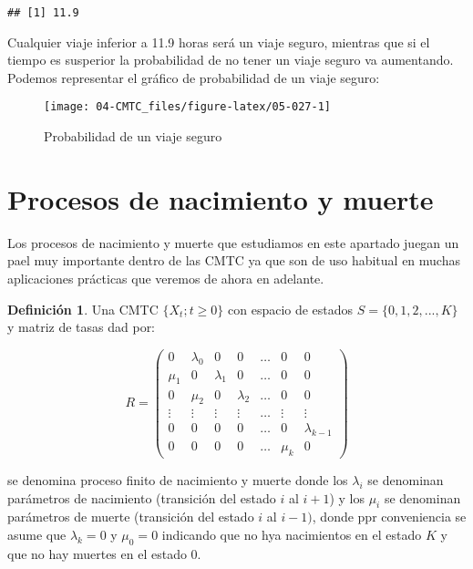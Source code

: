 \documentclass[
]{book}
\newenvironment{yellowbox}{
  \definecolor{shadecolor}{rgb}{210, 180, 140}  
  \color{black}
  \begin{shaded}}
 {\end{shaded}}
\theoremstyle{definition}
\newtheorem{definition}{Definición}[chapter]
\theoremstyle{definition}
\theoremstyle{definition}
\theoremstyle{definition}
\theoremstyle{remark}
\begin{document}
\begin{verbatim}
## [1] 11.9
\end{verbatim}

Cualquier viaje inferior a 11.9 horas será un viaje seguro, mientras que si el tiempo es susperior la probabilidad de no tener un viaje seguro va aumentando. Podemos representar el gráfico de probabilidad de un viaje seguro:

\begin{figure}

{\centering \texttt{[image: 04-CMTC\_files/figure-latex/05-027-1]} 

}

\caption{Probabilidad de un viaje seguro}\label{fig:05-027}
\end{figure}

\hypertarget{CMTCD}{%
\section{Procesos de nacimiento y muerte}\label{CMTCD}}

Los procesos de nacimiento y muerte que estudiamos en este apartado juegan un pael muy importante dentro de las CMTC ya que son de uso habitual en muchas aplicaciones prácticas que veremos de ahora en adelante.

\begin{yellowbox}

\begin{definition}
\protect\hypertarget{def:cmtc002}{}\label{def:cmtc002}Una CMTC \(\{X_t; t \geq 0\}\) con espacio de estados \(S = \{0, 1, 2,...,K\}\) y matriz de tasas dad por:

\[R = 
\begin{pmatrix}
0 & \lambda_0 & 0 & 0 & \ldots & 0 & 0 \\
\mu_1 & 0 & \lambda_1 & 0 & \ldots & 0 & 0 \\
0 & \mu_2 & 0 & \lambda_2 & \ldots & 0 & 0 \\
\vdots & \vdots & \vdots & \vdots & \ldots & \vdots & \vdots \\
0 & 0 & 0 & 0 & \ldots & 0 & \lambda_{k-1} \\
0 & 0 & 0 & 0 & \ldots &\mu_k & 0
\end{pmatrix} \]

se denomina proceso finito de nacimiento y muerte donde los \(\lambda_i\) se denominan parámetros de nacimiento (transición del estado \(i\) al \(i+1\)) y los \(\mu_i\) se denominan parámetros de muerte (transición del estado \(i\) al \(i-1)\), donde ppr conveniencia se asume que \(\lambda_k = 0\) y \(\mu_0 = 0\) indicando que no hya nacimientos en el estado \(K\) y que no hay muertes en el estado \(0\).
\end{definition}

\end{yellowbox}
\end{document}
